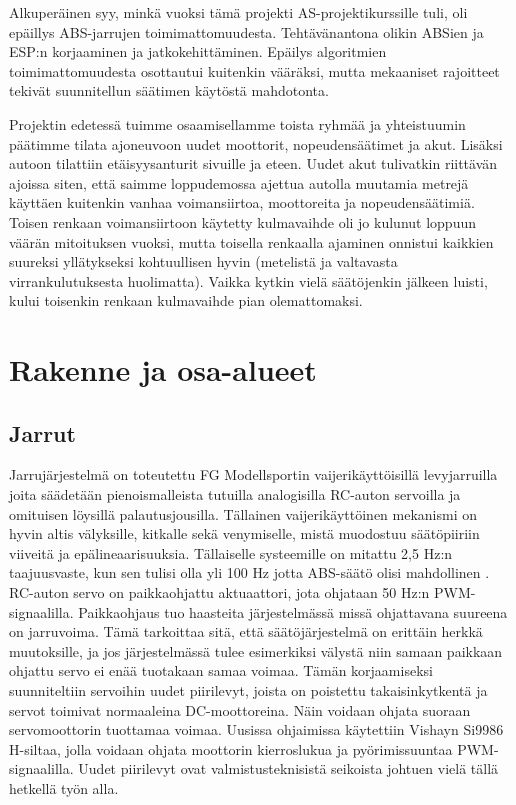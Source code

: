 \documentclass{article}
\begin{document}
Alkuperäinen syy, minkä vuoksi tämä projekti AS-projektikurssille tuli, oli epäillys ABS-jarrujen toimimattomuudesta. Tehtävänantona olikin ABSien ja ESP:n korjaaminen ja jatkokehittäminen. Epäilys algoritmien toimimattomuudesta osottautui kuitenkin vääräksi, mutta mekaaniset rajoitteet tekivät suunnitellun säätimen käytöstä mahdotonta.

Projektin edetessä tuimme osaamisellamme toista ryhmää ja yhteistuumin päätimme tilata ajoneuvoon uudet moottorit, nopeudensäätimet ja akut. Lisäksi autoon tilattiin etäisyysanturit sivuille ja eteen. Uudet akut tulivatkin riittävän ajoissa siten, että saimme loppudemossa ajettua autolla muutamia metrejä käyttäen kuitenkin vanhaa voimansiirtoa, moottoreita ja nopeudensäätimiä. Toisen renkaan voimansiirtoon käytetty kulmavaihde oli jo kulunut loppuun väärän mitoituksen vuoksi, mutta toisella renkaalla ajaminen onnistui kaikkien suureksi yllätykseksi kohtuullisen hyvin (metelistä ja valtavasta virrankulutuksesta huolimatta). Vaikka kytkin vielä säätöjenkin jälkeen luisti, kului toisenkin renkaan kulmavaihde pian olemattomaksi.

\section{Rakenne ja osa-alueet}
\subsection{Jarrut}
Jarrujärjestelmä on toteutettu FG Modellsportin vaijerikäyttöisillä levyjarruilla joita säädetään pienoismalleista tutuilla analogisilla RC-auton servoilla ja omituisen löysillä palautusjousilla. Tällainen vaijerikäyttöinen mekanismi on hyvin altis välyksille, kitkalle sekä venymiselle, mistä muodostuu säätöpiiriin viiveitä ja epälineaarisuuksia. Tällaiselle systeemille on mitattu 2,5 Hz:n taajuusvaste, kun sen tulisi olla yli 100 Hz jotta ABS-säätö olisi mahdollinen \cite{bib:testbed}.
RC-auton servo on paikkaohjattu aktuaattori, jota ohjataan 50 Hz:n PWM-signaalilla. Paikkaohjaus tuo haasteita järjestelmässä missä ohjattavana suureena on jarruvoima. Tämä tarkoittaa sitä, että säätöjärjestelmä on erittäin herkkä muutoksille, ja jos järjestelmässä tulee esimerkiksi välystä niin samaan paikkaan ohjattu servo ei enää tuotakaan samaa voimaa. Tämän korjaamiseksi suunniteltiin servoihin uudet piirilevyt, joista on poistettu takaisinkytkentä ja servot toimivat normaaleina DC-moottoreina. Näin voidaan ohjata suoraan servomoottorin tuottamaa voimaa. Uusissa ohjaimissa käytettiin Vishayn Si9986 \cite{bib:hbridge} H-siltaa, jolla voidaan ohjata moottorin kierroslukua ja pyörimissuuntaa PWM-signaalilla.
Uudet piirilevyt ovat valmistusteknisistä seikoista johtuen vielä tällä hetkellä työn alla.
\end{document}
